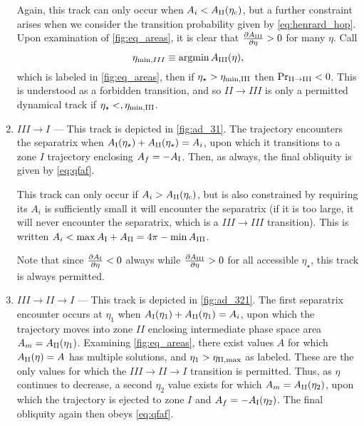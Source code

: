\documentclass[
        fleqn,
        usenatbib,
        referee,
    ]{mnras}
\newcommand*{\pd}[2]{\frac{\partial#1}{\partial#2}}
\DeclareMathOperator*{\argmin}{argmin}
\begin{document}
\begin{enumerate}
        Again, this track can only occur when $A_i < A_{\rm II}(\eta_{\rm c})$, but a
        further constraint arises when we consider the transition probability
        given by \autoref{eq:henrard_hop}. Upon examination of
        \autoref{fig:eq_areas}, it is clear that $\pd{A_{\rm III}}{\eta} > 0$ for
        many $\eta$. Call
        \begin{equation}
            \eta_{\min, III} \equiv \argmin A_{\rm III}(\eta),
        \end{equation}
        which is labeled in \autoref{fig:eq_areas}, then if $\eta_\star >
        \eta_{\rm \min, III}$ then $\Pr_{\rm II \to III} < 0$. This is understood as a
        forbidden transition, and so $II \to III$ is only a permitted dynamical
        track if $\eta_\star <, \eta_{\rm \min, III}$.

    \item $III \to I$ --- This track is depicted in \autoref{fig:ad_31}.
        The trajectory encounters the separatrix when $A_{\rm I}(\eta_\star) +
        A_{\rm II}(\eta_\star) = A_i$, upon which it transitions to a zone $I$
        trajectory enclosing $A_f = -A_{\rm I}$. Then, as always, the final
        obliquity is given by \autoref{eq:qfaf}.

        This track can only occur if $A_i > A_{\rm II}(\eta_{\rm c})$, but is also
        constrained by requiring its $A_i$ is sufficiently small it will
        encounter the separatrix (if it is too large, it will never encounter
        the separatrix, which is a $III \to III$ transition). This is written
        $A_i < \max A_{\rm I} + A_{\rm II} = 4\pi - \min A_{\rm III}$.

        Note that since $\pd{A_{\rm I}}{\eta} < 0$ always while $\pd{A_{\rm
        III}}{\eta} > 0$ for all accessible $\eta_{\star}$, this track is always
        permitted.

    \item $III \to II \to I$ --- This track is depicted in \autoref{fig:ad_321}.
        The first separatrix encounter occurs at $\eta_1$ when $A_{\rm
        I}(\eta_1) + A_{\rm II}(\eta_1) = A_i$, upon which the trajectory moves
        into zone $II$ enclosing intermediate phase space area $A_m = A_{\rm
        II}(\eta_1)$. Examining \autoref{fig:eq_areas}, there exist values $A$
        for which $A_{\rm II}(\eta) = A$ has multiple solutions, and $\eta_1 >
        \eta_{\rm II, \max}$ as labeled. These are the only values for which the
        $III \to II \to I$ transition is permitted. Thus, as $\eta$ continues to
        decrease, a second $\eta_2$ value exists for which $A_m = A_{\rm
        II}(\eta_2)$, upon which the trajectory is ejected to zone $I$ and $A_f
        = -A_{\rm I}(\eta_2)$. The final obliquity again then obeys
        \autoref{eq:qfaf}.


\end{enumerate}
\end{document}

